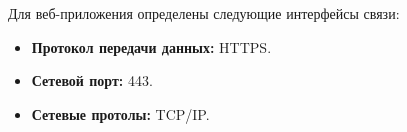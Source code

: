 
Для веб-приложения определены следующие интерфейсы связи:

\begin{itemize}
    \item \textbf{Протокол передачи данных:} HTTPS.
    \item \textbf{Сетевой порт:} 443.
    \item \textbf{Сетевые протолы:} TCP/IP.
\end{itemize}